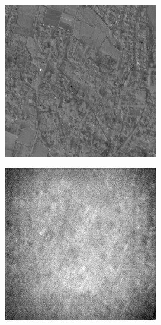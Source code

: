 \documentclass[10pt,twocolumn,letterpaper]{article}
\begin{document}
\onecolumn
\begin{figure}[!ht]
  \centering
  \begin{subfigure}[b]{0.19\textwidth}
      \centering
      \includegraphics[width=\textwidth]{../figs/outputs/pan/2.png}
  \end{subfigure}
  \hfill
  \begin{subfigure}[b]{0.19\textwidth}
      \centering
      \includegraphics[width=\textwidth]{../figs/outputs/cycleGan/2.png}

\end{subfigure}
\end{figure}
\end{document}
